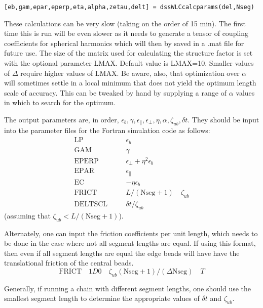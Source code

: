 \documentclass[12pt]{article}
\begin{document}
\begin{verbatim}
[eb,gam,epar,eperp,eta,alpha,zetau,delt] = dssWLCcalcparams(del,Nseg)
\end{verbatim}

These calculations can be very slow (taking on the order of 15 min). The first time this is run will be even slower as it needs to generate a tensor of coupling coefficients for spherical harmonics which will then by saved in a .mat file for future use. The size of the matrix used for calculating the structure factor is set with the optional parameter LMAX. Default value is LMAX=10. Smaller values of $\Delta$ require higher values of LMAX. Be aware, also, that optimization over $\alpha$ will sometimes settle in a local minimum that does not yield the optimum length scale of accuracy. This can be tweaked by hand by supplying a range of $\alpha$ values in which to search for the optimum.

The output parameters are, in order, $\epsilon_b, \gamma, \epsilon_\parallel, \epsilon_\perp, \eta, \alpha, \zeta_{ub}, \delta t$. They should be input into the parameter files for the Fortran simulation code as follows:
\begin{eqnarray*}
\text{LP} & \quad & \epsilon_b \\
\text{GAM} & \quad & \gamma \\
\text{EPERP} & \quad & \epsilon_\perp + \eta^2\epsilon_b \\
\text{EPAR} & \quad & \epsilon_\parallel \\
\text{EC} & \quad & - \eta \epsilon_b \\
\text{FRICT} & \quad & L/(\text{Nseg}+1) \quad \zeta_{ub} \\
\text{DELTSCL} & \quad & \delta t/\zeta_{ub}
\end{eqnarray*}
(assuming that  $\zeta_{ub} < L/(\text{Nseg}+1)$). 

Alternately, one can input the friction coefficients per unit length, which needs to be done in the case where not all segment lengths are equal. If using this format, then even if all segment lengths are equal the edge beads will have have the translational friction of the central beads.
\begin{equation*}
\text{FRICT} \quad 1D0 \quad \zeta_{ub}(\text{Nseg}+1)/(\Delta \text{Nseg}) \quad T
\end{equation*}

Generally, if running a chain with different segment lengths, one should use the smallest segment length to determine the appropriate values of $\delta t$ and $\zeta_{ub}$. 
\end{document}
